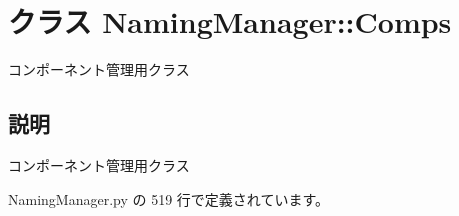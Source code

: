 \section{クラス NamingManager::Comps}
\label{classsource__py_1_1_naming_manager_1_1_naming_manager_1_1_comps}
コンポーネント管理用クラス  




\subsection{説明}
コンポーネント管理用クラス 

 NamingManager.py の 519 行で定義されています。